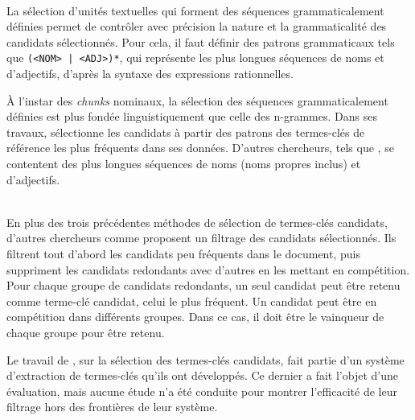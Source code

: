     \begin{example}
    \end{example}

    ~\\La sélection d'unités textuelles qui forment des séquences
    grammaticalement définies permet de contrôler
    avec précision la nature et la grammaticalité des candidats sélectionnés.
    Pour cela, il faut définir des patrons grammaticaux tels que \texttt{(<NOM>
    | <ADJ>)*}, qui représente les plus longues séquences de noms et
    d'adjectifs, d'après la syntaxe des expressions rationnelles.

    À l'instar des \textit{chunks} nominaux, la sélection des séquences
    grammaticalement définies est plus fondée linguistiquement que celle des
    n-grammes. Dans ses travaux, 
    sélectionne les candidats à partir des patrons des termes-clés de référence
    les plus fréquents dans ses données. D'autres chercheurs,
    tels que , se contentent des plus longues
    séquences de noms (noms propres inclus) et d'adjectifs.

    \begin{example}
    \end{example}

    ~\\En plus des trois précédentes méthodes de sélection de termes-clés
    candidats, d'autres chercheurs comme
     proposent un filtrage
    des candidats sélectionnés. Ils filtrent tout d'abord les candidats peu
    fréquents dans le document, puis suppriment les candidats redondants avec
    d'autres en les mettant en compétition. Pour chaque groupe de candidats
    redondants, un seul candidat peut être retenu comme terme-clé candidat,
    celui le plus fréquent. Un candidat peut être en compétition dans différents
    groupes. Dans ce cas, il doit être le \og{}vainqueur\fg{} de chaque groupe
    pour être retenu.

    Le travail de , sur la
    sélection des termes-clés candidats, fait partie d'un système d'extraction
    de termes-clés qu'ils ont développés. Ce dernier a fait l'objet d'une
    évaluation, mais aucune étude n'a été conduite pour montrer l'efficacité de
    leur filtrage hors des frontières de leur système.


